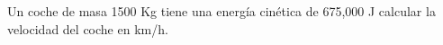 Un coche de masa 1500 Kg tiene una energía cinética de 675,000 J calcular la velocidad del coche en km/h.

\begin{solutionbox}{5cm}
    \begin{multicols}{2}

    \end{multicols}
\end{solutionbox}
